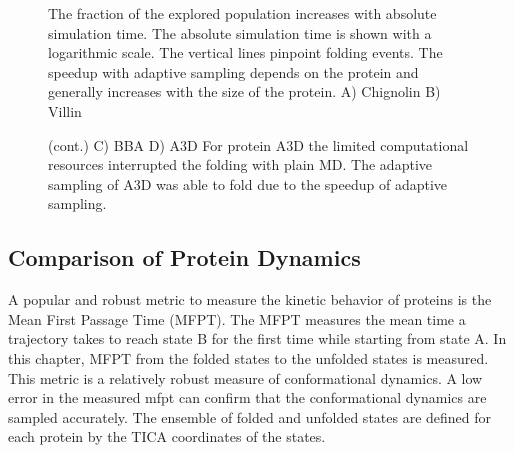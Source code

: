 \begin{figure}[H]
\centering
   \begin{subfigure}[b]{0.6\linewidth}
   {}
   \end{subfigure}%
   
   \begin{subfigure}[b]{0.6\linewidth}
   {}
   \end{subfigure}%


  \caption{The fraction of the explored population increases with absolute simulation time. The absolute simulation time is shown with a logarithmic scale. The vertical lines pinpoint folding events. The speedup with adaptive sampling depends on the protein and generally increases with the size of the protein. A) Chignolin B) Villin }
\end{figure}

\begin{figure}[H]\ContinuedFloat
\centering
   \begin{subfigure}[b]{0.6\linewidth}
   {}
    \end{subfigure}%

   \begin{subfigure}[b]{0.6\linewidth}
   {}
    \end{subfigure}%
  \caption{(cont.)  C) BBA D) A3D For protein A3D the limited computational resources interrupted the folding with plain MD. The adaptive sampling of A3D was able to fold due to the speedup of adaptive sampling.}
  \label{fig:Pop_explored}
\end{figure}





\subsection{\label{sec:kinetics}Comparison of Protein Dynamics}



A popular and robust metric to measure the kinetic behavior of proteins is the Mean First Passage Time (MFPT). The MFPT measures the mean time a trajectory takes to reach state B for the first time while starting from state A. In this chapter, MFPT from the folded states to the unfolded states is measured. This metric is a relatively robust measure of conformational dynamics. A low error in the measured mfpt can confirm that the conformational dynamics are sampled accurately. The ensemble of folded and unfolded states are defined for each protein by the TICA coordinates of the states. 

